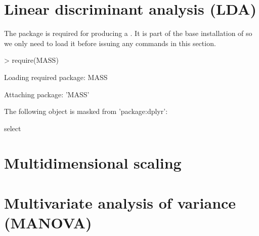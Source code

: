 \section{Linear discriminant analysis (LDA)} 
 
The  package is required for producing a . It is part of the base installation of \R{} so we only need to load it before issuing any commands in this section. 
\begin{Schunk}
\begin{Sinput}
> require(MASS) 
\end{Sinput}
\begin{Soutput}
Loading required package: MASS
\end{Soutput}
\begin{Soutput}

Attaching package: 'MASS'
\end{Soutput}
\begin{Soutput}
The following object is masked from 'package:dplyr':

    select
\end{Soutput}
\end{Schunk}
 
\section{Multidimensional scaling} 
 
\section{Multivariate analysis of variance (MANOVA)} 
 
 
\section{} 
 
 
\section{} 
 
 
\section{} 
 
 
\section{} 
 
 
\section{} 
 
 
\section{} 
 
 
 


